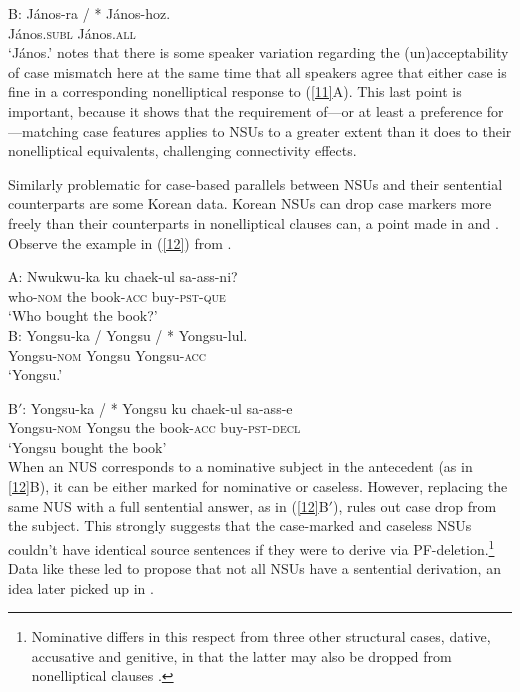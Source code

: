 {B: \gll J\'{a}nos-ra / * J\'{a}nos-hoz.\\
        J\'{a}nos.\textsc{subl} {} {} J\'{a}nos.\textsc{all}\\
\glt  `J\'{a}nos.'\label{11}
\z
%
\citet{Jacobson2016} notes that there is some speaker variation regarding the (un)ac\-cepta\-bi\-li\-ty of case mismatch here at the same time that all speakers agree that either case is fine in a corresponding nonelliptical response to (\ref{11}A). This last point is important, because it shows that the requirement of---or at least a preference for---matching case features applies to NSUs to a greater extent than it does to their nonelliptical equivalents, challenging connectivity effects.

Similarly problematic for case-based parallels between NSUs and their sentential counterparts are some Korean data. Korean NSUs can drop case markers more freely than their counterparts in nonelliptical clauses can, a point made in \citet{Morgan1989} and \citet{Kim2015}. Observe the example in (\ref{12}) from \citet[237]{Morgan1989}.

  \ea
A: \gll Nwukwu-ka        ku  chaek-ul          sa-ass-ni?\\
        who-\textsc{nom} the book-\textsc{acc} buy-\textsc{pst}-\textsc{que}\\
\glt  `Who bought the book?'\\

B: \gll Yongsu-ka / Yongsu / * Yongsu-lul.\\
        Yongsu-\textsc{nom} {} Yongsu {} {} Yongsu-\textsc{acc}\\
\glt  `Yongsu.'

B$'$: \gll Yongsu-ka            /  *  Yongsu ku  chaek-ul          sa-ass-e\\
           Yongsu-\textsc{nom}  {} {} Yongsu the book-\textsc{acc} buy-\textsc{pst}-\textsc{decl}\\
\glt  `Yongsu bought the book'\\
\label{12}
\z
%
When an NUS corresponds to a nominative subject in the antecedent (as in \ref{12}B), it can be either marked for nominative or caseless.
However, replacing the same NUS with a full sentential answer, as in (\ref{12}B$'$), rules out case drop from the subject. This strongly suggests that the case-marked and caseless NSUs couldn't have identical source sentences if they were to derive via PF-deletion.\footnote{Nominative differs in this respect from three other structural cases, dative, accusative and genitive, in that the latter may also be dropped from nonelliptical clauses \citep[see][]{Morgan1989, Lee2016, Kim2016}.}  Data like these led \citet{Morgan1989} to propose that not all NSUs have a sentential derivation, an idea later picked up in \citet{Barton1998}.

}
